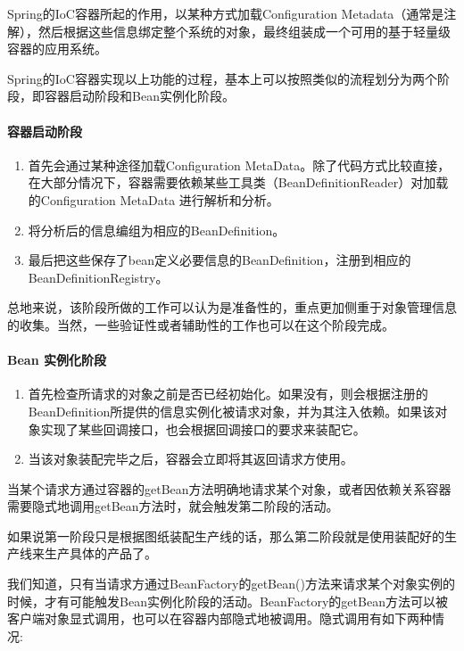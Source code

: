 Spring的IoC容器所起的作用，以某种方式加载Configuration Metadata（通常是注解），然后根据这些信息绑定整个系统的对象，最终组装成一个可用的基于轻量级容器的应用系统。

Spring的IoC容器实现以上功能的过程，基本上可以按照类似的流程划分为两个阶段，即容器启动阶段和Bean实例化阶段。

\paragraph*{容器启动阶段}
\begin{enumerate}
    \item 首先会通过某种途径加载Configuration MetaData。除了代码方式比较直接，在大部分情况下，容器需要依赖某些工具类（BeanDefinitionReader）对加载的Configuration  MetaData 进行解析和分析。
    \item 将分析后的信息编组为相应的BeanDefinition。
    \item 最后把这些保存了bean定义必要信息的BeanDefinition，注册到相应的BeanDefinitionRegistry。
\end{enumerate}

总地来说，该阶段所做的工作可以认为是准备性的，重点更加侧重于对象管理信息的收集。当然，一些验证性或者辅助性的工作也可以在这个阶段完成。

\paragraph*{Bean 实例化阶段}

\begin{enumerate}
    \item 首先检查所请求的对象之前是否已经初始化。如果没有，则会根据注册的BeanDefinition所提供的信息实例化被请求对象，并为其注入依赖。如果该对象实现了某些回调接口，也会根据回调接口的要求来装配它。
    \item 当该对象装配完毕之后，容器会立即将其返回请求方使用。
\end{enumerate}

当某个请求方通过容器的getBean方法明确地请求某个对象，或者因依赖关系容器需要隐式地调用getBean方法时，就会触发第二阶段的活动。

如果说第一阶段只是根据图纸装配生产线的话，那么第二阶段就是使用装配好的生产线来生产具体的产品了。

我们知道，只有当请求方通过BeanFactory的getBean()方法来请求某个对象实例的时候，才有可能触发Bean实例化阶段的活动。BeanFactory的getBean方法可以被客户端对象显式调用，也可以在容器内部隐式地被调用。隐式调用有如下两种情况:

